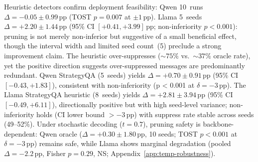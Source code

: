 Heuristic detectors confirm deployment feasibility: Qwen 10~runs $\Delta = -0.05 \pm 0.99$\,pp (TOST $p = 0.007$ at $\pm 1$\,pp). Llama 5~seeds $\Delta = +2.20 \pm 1.44$\,pp (95\% CI $[+0.41, +3.99]$\,pp; non-inferiority $p < 0.001$): pruning is not merely non-inferior but suggestive of a small beneficial effect, though the interval width and limited seed count~(5) preclude a strong improvement claim. The heuristic over-suppresses (${\sim}75\%$ vs.\ ${\sim}37\%$ oracle rate), yet the positive direction suggests over-suppressed messages are predominantly redundant.
Qwen StrategyQA (5~seeds) yields $\Delta = +0.70 \pm 0.91$\,pp (95\% CI $[-0.43, +1.83]$), consistent with non-inferiority (p < 0.001 at $\delta = -3$\,pp).
The Llama StrategyQA heuristic (8~seeds) yields $\Delta = +2.81 \pm 3.94$\,pp (95\% CI $[-0.49, +6.11]$), directionally positive but with high seed-level variance; non-inferiority holds (CI lower bound $> -3$\,pp) with suppress rate stable across seeds (49--52\%).
Under stochastic decoding ($t{=}0.7$), pruning safety is backbone-dependent: Qwen oracle ($\Delta = +0.30 \pm 1.80$\,pp, 10 seeds; TOST $p < 0.001$ at $\delta = -3$\,pp) remains safe, while Llama shows marginal degradation (pooled $\Delta = -2.2$\,pp, Fisher $p = 0.29$, NS; Appendix~\ref{app:temp-robustness}).


